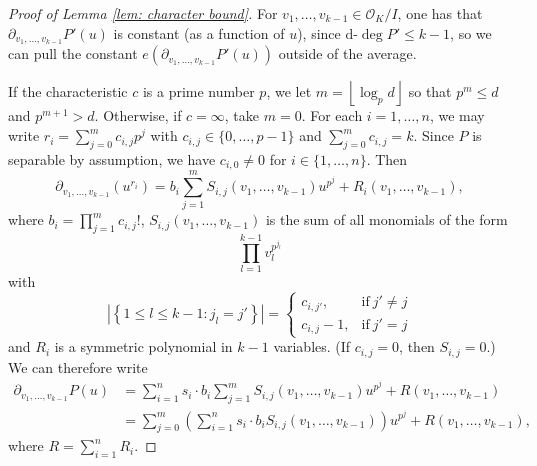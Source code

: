 \documentclass{amsart}
\theoremstyle{definition}
\numberwithin{equation}{section}
\newcommand{\mO}{\mathcal{O}}
\newcommand{\floor}[1]{\left\lfloor #1 \right\rfloor}
\newcommand{\ddeg}{\text{d-}\deg}
\begin{document}
\begin{proof}[Proof of Lemma \ref{lem: character bound}]
	For $v_1, \dots, v_{k-1} \in \mO_K/I$, one has that $\partial_{v_1, \dots, v_{k-1}}P'(u)$ is constant (as a function of $u$),
	since $\ddeg{P'} \le k-1$, so we can pull the constant $e \left( \partial_{v_1, \dots, v_{k-1}}P'(u) \right)$
	outside of the average.
    
    If the characteristic $c$ is a prime number $p$, we let $m = \floor{\log_p{d}}$ so that $p^m \le d$ and $p^{m+1} > d$.
    Otherwise, if $c = \infty$, take $m = 0$.
	For each $i = 1, \dots, n$, we may write $r_i = \sum_{j=0}^m{c_{i,j}p^j}$ with $c_{i,j} \in \{0, \dots, p-1\}$ and $\sum_{j=0}^m{c_{i,j}} = k$.
	Since $P$ is separable by assumption, we have $c_{i,0} \ne 0$ for $i \in \{1, \dots, n\}$.
	Then
	\begin{equation*}
		\partial_{v_1, \dots, v_{k-1}}(u^{r_i}) = b_i \sum_{j=1}^m{S_{i,j}(v_1, \dots, v_{k-1}) u^{p^j}} + R_i(v_1, \dots, v_{k-1}),
	\end{equation*}
	where $b_i = \prod_{j=1}^m{c_{i,j}!}$, $S_{i,j}(v_1, \dots, v_{k-1})$ is the sum of all monomials of the form
	\begin{equation*}
		\prod_{l=1}^{k-1}{v_l^{p^{j_l}}}
	\end{equation*}
	with
	\begin{equation*}
		\left| \left\{ 1 \le l \le k-1 : j_l = j' \right\} \right| = \begin{cases}
			c_{i,j'}, & \text{if}~j' \ne j \\
			c_{i,j} - 1, & \text{if}~j' = j
		\end{cases}
	\end{equation*}
	and $R_i$ is a symmetric polynomial in $k-1$ variables.
	(If $c_{i,j} = 0$, then $S_{i,j} = 0$.)
	We can therefore write
	\begin{align*}
		\partial_{v_1, \dots, v_{k-1}}P(u)
		 & = \sum_{i=1}^n{s_i \cdot b_i \sum_{j=1}^m{S_{i,j}(v_1, \dots, v_{k-1}) u^{p^j}}} + R(v_1, \dots, v_{k-1}) \\
		 & = \sum_{j=0}^m{\left( \sum_{i=1}^n{s_i \cdot b_i S_{i,j}(v_1, \dots, v_{k-1})} \right) u^{p^j}} + R(v_1, \dots, v_{k-1}),
	\end{align*}
	where $R = \sum_{i=1}^n{R_i}$.
	

\end{proof}
\end{document}
